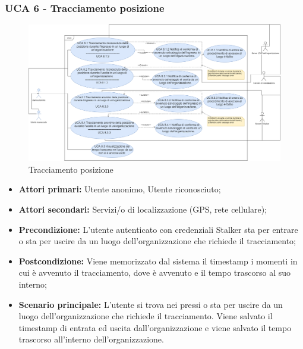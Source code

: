 \subsubsection{UCA 6 - Tracciamento posizione}%

\begin{figure}[h]
	\centering
	\includegraphics[scale=0.3]{sezioni/UseCase/Immagini/UCA6.png}
	\caption{Tracciamento posizione}
\end{figure}

\begin{itemize}
	\item \textbf{Attori primari:} Utente anonimo, Utente riconosciuto;
	\item \textbf{Attori secondari:} Servizi/o di localizzazione (GPS, rete cellulare);
	\item \textbf{Precondizione:} L'utente autenticato con credenziali Stalker sta per entrare o sta per uscire da un luogo dell'organizzazione che richiede il tracciamento;
	\item \textbf{Postcondizione:} Viene memorizzato dal sistema il timestamp i momenti in cui è avvenuto il tracciamento, dove è avvenuto e il tempo trascorso al suo interno;
	\item \textbf{Scenario principale:} L'utente si trova nei pressi o sta per uscire da un luogo dell'organizzazione che richiede il tracciamento. Viene salvato il timestamp di entrata ed uscita dall'organizzazione e viene salvato il tempo trascorso all'interno dell'organizzazione.
\end{itemize}

